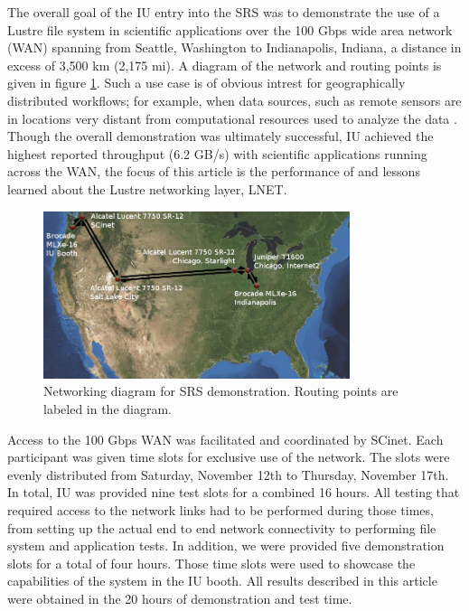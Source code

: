 \documentclass[]{sigplan-proc}
\begin{document}
The overall goal of the IU entry into the SRS was to demonstrate the use of a Lustre file system in scientific
applications over the 100 Gbps wide area network (WAN) spanning from Seattle, Washington to Indianapolis,
Indiana, a distance in excess of 3,500 km (2,175 mi). A diagram of the network and routing points is given in
figure \ref{fig:network}. Such a use case is of obvious intrest for geographically distributed workflows; for
example, when data sources, such as remote sensors are in locations very distant from computational resources
used to analyze the data \cite{henschel2010}. Though the overall demonstration was ultimately successful, IU
achieved the highest reported throughput (6.2 GB/s) with scientific applications running across the WAN, the
focus of this article is the performance of and lessons learned about the Lustre networking layer, LNET.

\begin{figure}[t]
\begin{center}
\includegraphics[width=0.80\textwidth]{figures/network.png}
\caption{Networking diagram for SRS demonstration. Routing points are labeled in the diagram.}
\label{fig:network}
\end{center}
\end{figure}

Access to the 100 Gbps WAN was facilitated and coordinated by SCinet. Each participant was given time slots
for exclusive use of the network. The slots were evenly distributed from Saturday, November 12th to Thursday,
November 17th. In total, IU was provided nine test slots for a combined 16 hours. All testing that required
access to the network links had to be performed during those times, from setting up the actual end to end
network connectivity to performing file system and application tests. In addition, we were provided five
demonstration slots for a total of four hours. Those time slots were used to showcase the capabilities of the
system in the IU booth. All results described in this article were obtained in the 20 hours of demonstration
and test time.
\end{document}
